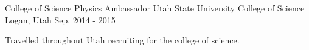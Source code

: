\begin{cventries}

\cventry
{College of Science Physics Ambassador} %
{Utah State University College of Science} %
{Logan, Utah} %
{Sep. 2014 - 2015} %
{ %
\begin{cvitems}
\item {Travelled throughout Utah recruiting for the college of science.}
\end{cvitems}
}



\end{cventries}